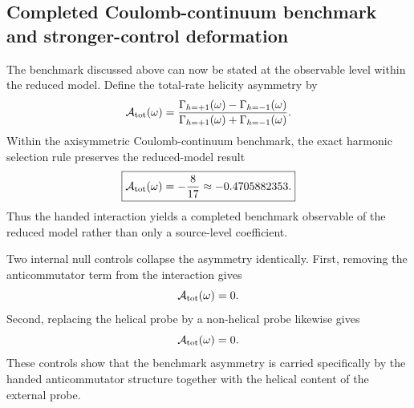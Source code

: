 \documentclass[11pt,a4paper]{article}
\begin{document}
    \subsection{Completed Coulomb-continuum benchmark and stronger-control deformation}

    The benchmark discussed above can now be stated at the observable level within the reduced model. Define the total-rate helicity asymmetry by
    \begin{equation}
        \mathcal A_{\rm tot}(\omega)
        =
        \frac{\Gamma_{h=+1}(\omega)-\Gamma_{h=-1}(\omega)}
             {\Gamma_{h=+1}(\omega)+\Gamma_{h=-1}(\omega)}.
    \end{equation}
    Within the axisymmetric Coulomb-continuum benchmark, the exact harmonic selection rule preserves the reduced-model result
    \begin{equation}
        \boxed{
        \mathcal A_{\rm tot}(\omega)=-\frac{8}{17}\approx -0.4705882353.
        }
    \end{equation}
    Thus the handed interaction yields a completed benchmark observable of the reduced model rather than only a source-level coefficient.

    Two internal null controls collapse the asymmetry identically. First, removing the anticommutator term from the interaction gives
    \begin{equation}
        \mathcal A_{\rm tot}(\omega)=0.
    \end{equation}
    Second, replacing the helical probe by a non-helical probe likewise gives
    \begin{equation}
        \mathcal A_{\rm tot}(\omega)=0.
    \end{equation}
    These controls show that the benchmark asymmetry is carried specifically by the handed anticommutator structure together with the helical content of the external probe.
\end{document}
